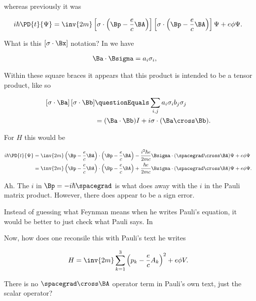 whereas previously it was

\begin{align*}
i \hbar \PD{t}{\Psi} = \inv{2m} 
\left[\sigma \cdot \left( \Bp - \frac{e}{c} \BA \right)\right]
\left[\sigma \cdot \left( \Bp - \frac{e}{c} \BA \right)\right]
 \Psi + e \phi \Psi.
\end{align*}

What is this $[\sigma \cdot \Bx]$ notation?  In \cite{wiki:pauli} we have

\begin{align*}
\Ba \cdot \Bsigma &= a_i \sigma_i,
\end{align*}

Within these square braces it appears that this product is intended to be a tensor product, like so

\begin{align*}
\left[\sigma \cdot \Ba\right]
\left[\sigma \cdot \Bb\right] 
&\questionEquals \sum_{i,j} a_i \sigma_i b_j \sigma_j \\
&= (\Ba \cdot \Bb) I + i \sigma \cdot (\Ba \cross \Bb).
\end{align*}

For $H$ this would be

\begin{align*}
i \hbar \PD{t}{\Psi} 
&= \inv{2m} 
\left( \Bp - \frac{e}{c} \BA \right) \cdot \left( \Bp - \frac{e}{c} \BA \right)
- \frac{i^2 \hbar e}{2m c} \Bsigma \cdot (\spacegrad \cross \BA) \Psi + e \phi \Psi \\
&= \inv{2m} 
\left( \Bp - \frac{e}{c} \BA \right) \cdot \left( \Bp - \frac{e}{c} \BA \right)
+ \frac{\hbar e}{2m c} \Bsigma \cdot (\spacegrad \cross \BA) \Psi + e \phi \Psi.
\end{align*}

Ah.  The $i$ in $\Bp = -i \hbar \spacegrad$ is what does away with the $i$ in the Pauli matrix product.  However, there does appear to be a sign error.

Instead of guessing what Feynman means when he writes Pauli's equation, it would be better to just check what Pauli says.  In 

Now, how does one reconsile this with Pauli's text \cite{pauli2000wm} he writes

\begin{align*}
H = \inv{2m} \sum_{k=1}^3 \left( p_k - \frac{e}{c}A_k \right)^2 + e \phi V.
\end{align*}

There is no $\spacegrad \cross \BA$ operator term in Pauli's own text, just the scalar operator?

